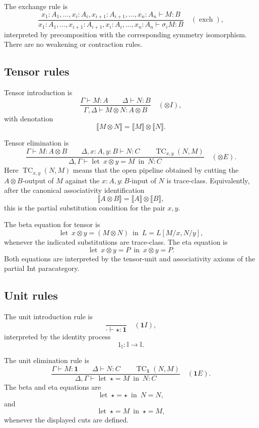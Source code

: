 The exchange rule is
\[
\frac{
  x_1:A_1,\ldots,x_i:A_i,x_{i+1}:A_{i+1},\ldots,x_n:A_n
  \vdash M:B
}{
  x_1:A_1,\ldots,x_{i+1}:A_{i+1},x_i:A_i,\ldots,x_n:A_n
  \vdash \sigma_i M:B
}
\quad(\operatorname{exch}),
\]
interpreted by precomposition with the corresponding symmetry isomorphism.
There are no weakening or contraction rules.

\subsection{Tensor rules}

Tensor introduction is
\[
\frac{
  \Gamma\vdash M:A
  \qquad
  \Delta\vdash N:B
}{
  \Gamma,\Delta\vdash M\otimes N:A\otimes B
}
\quad(\otimes I),
\]
with denotation
\[
\llbracket M\otimes N\rrbracket
=
\llbracket M\rrbracket\otimes\llbracket N\rrbracket.
\]

Tensor elimination is
\[
\frac{
  \Gamma\vdash M:A\otimes B
  \qquad
  \Delta,x:A,y:B\vdash N:C
  \qquad
  \operatorname{TC}_{x,y}(N,M)
}{
  \Delta,\Gamma\vdash
  \operatorname{let}\ x\otimes y=M\ \operatorname{in}\ N
  :C
}
\quad(\otimes E).
\]
Here \(\operatorname{TC}_{x,y}(N,M)\) means that the open pipeline obtained by
cutting the \(A\otimes B\)-output of \(M\) against the \(x:A,y:B\)-input of
\(N\) is trace-class.  Equivalently, after the canonical associativity
identification
\[
\llbracket A\otimes B\rrbracket
=
\llbracket A\rrbracket\otimes\llbracket B\rrbracket,
\]
this is the partial substitution condition for the pair \(x,y\).

The beta equation for tensor is
\[
\operatorname{let}\ x\otimes y=(M\otimes N)\ \operatorname{in}\ L
=
L[M/x,N/y],
\]
whenever the indicated substitutions are trace-class.  The eta equation is
\[
\operatorname{let}\ x\otimes y=P\ \operatorname{in}\ x\otimes y
=
P.
\]
Both equations are interpreted by the tensor-unit and associativity axioms of
the partial Int paracategory.

\subsection{Unit rules}

The unit introduction rule is
\[
\frac{}{\cdot\vdash \star:\mathbf 1}
\quad(\mathbf 1 I),
\]
interpreted by the identity process
\[
1_{\mathbb I}:\mathbb I\to\mathbb I.
\]

The unit elimination rule is
\[
\frac{
  \Gamma\vdash M:\mathbf 1
  \qquad
  \Delta\vdash N:C
  \qquad
  \operatorname{TC}_{\mathbf 1}(N,M)
}{
  \Delta,\Gamma\vdash
  \operatorname{let}\ \star=M\ \operatorname{in}\ N
  :C
}
\quad(\mathbf 1 E).
\]
The beta and eta equations are
\[
\operatorname{let}\ \star=\star\ \operatorname{in}\ N=N,
\]
and
\[
\operatorname{let}\ \star=M\ \operatorname{in}\ \star=M,
\]
whenever the displayed cuts are defined.

